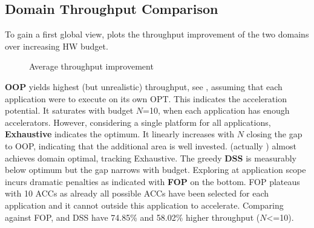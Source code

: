 \subsection{Domain Throughput Comparison}
\label{sec:resTh}

To gain a first global view,  plots the throughput improvement of the two domains over increasing HW budget.

\begin{figure}[htb]
	\centering
		\hfill
	\caption{Average throughput improvement}
	\label{fig:th}
\end{figure}

\textbf{OOP} yields highest (but unrealistic) throughput, see , assuming that each application were to execute on its own OPT. This indicates the acceleration potential. It saturates with budget $N$=10, when each application has enough accelerators. However, considering a single platform for all applications, \textbf{Exhaustive} indicates the optimum. It linearly increases with $N$ closing the gap to OOP, indicating that the additional area is well invested. \textbf{\ga} (actually \gah) almost achieves domain optimal, tracking Exhaustive. The greedy \textbf{DSS} is measurably below optimum but the gap narrows with budget. Exploring at application scope incurs dramatic penalties as indicated with \textbf{FOP} on the bottom.
FOP plateaus with 10 ACCs as already all possible ACCs have been selected for each application and it cannot outside this application to accelerate.
Comparing against FOP, \ga and DSS have 74.85\% and 58.02\% higher throughput ($N$\textless=10).

